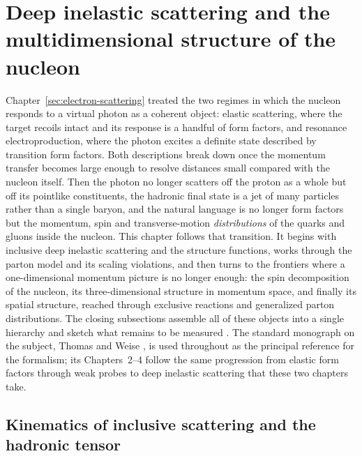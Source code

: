 \section{Deep inelastic scattering and the multidimensional structure of the nucleon}
\label{sec:dis-nucleon-structure}

Chapter~\ref{sec:electron-scattering} treated the two regimes in which the nucleon
responds to a virtual photon as a coherent object: elastic scattering, where the target
recoils intact and its response is a handful of form factors, and resonance
electroproduction, where the photon excites a definite state described by transition
form factors. Both descriptions break down once the momentum transfer becomes large
enough to resolve distances small compared with the nucleon itself. Then the photon no
longer scatters off the proton as a whole but off its pointlike constituents, the
hadronic final state is a jet of many particles rather than a single baryon, and the
natural language is no longer form factors but the momentum, spin and transverse-motion
\emph{distributions} of the quarks and gluons inside the nucleon. This chapter follows
that transition. It begins with inclusive deep inelastic scattering and the structure
functions, works through the parton model and its scaling violations, and then turns to
the frontiers where a one-dimensional momentum picture is no longer enough: the spin
decomposition of the nucleon, its three-dimensional structure in momentum space, and
finally its spatial structure, reached through exclusive reactions and generalized
parton distributions. The closing subsections assemble all of these objects into a
single hierarchy and sketch what remains to be measured
\cite[Ch.~1]{Amsler2018}. The standard monograph on the subject, Thomas and Weise
\cite{ThomasWeise2001}, is used throughout as the principal reference for the
formalism; its Chapters~2--4 follow the same progression from elastic form factors
through weak probes to deep inelastic scattering that these two chapters take.

\subsection{Kinematics of inclusive scattering and the hadronic tensor}
\label{subsec:inclusive-kinematics}

